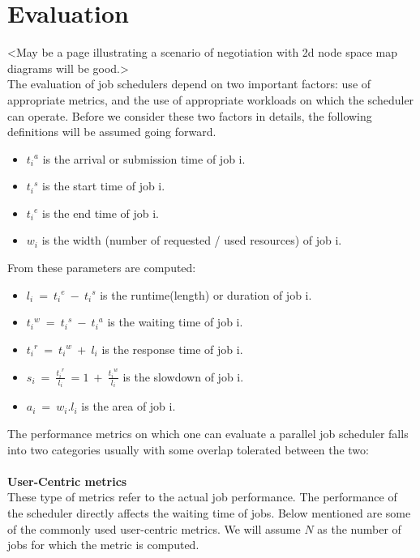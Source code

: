 \chapter{Evaluation}\label{chapter:evaluation}
<May be a page illustrating a scenario of negotiation with 2d node space map diagrams will be good.>\\
The evaluation of job schedulers depend on two important factors: use of appropriate metrics, and the use of appropriate workloads on which the scheduler can operate. Before we consider these two factors in details, the following definitions will be assumed going forward.
\begin{itemize}
\item \textit{${t_{i}}^{a}$} is the arrival or submission time of job i.
\item \textit{${t_{i}}^{s}$} is the start time of job i.
\item \textit{${t_{i}}^{e}$} is the end time of job i.
\item \textit{$w_{i}$} is the width (number of requested / used resources) of job i.
\end{itemize}
From these parameters are computed:
\begin{itemize}
\item \textit{$l_{i}\ =\ {t_{i}}^{e}\ -\ {t_{i}}^{s}$} is the runtime(length) or duration of job i.
\item \textit{${t_{i}}^{w}\ =\ {t_{i}}^{s}\ -\ {t_{i}}^{a}$} is the waiting time of job i.
\item \textit{${t_{i}}^{r}\ =\ {t_{i}}^{w}\ +\ l_{i}$} is the response time of job i.
\item \textit{$s_{i}\ =\ \frac{{t_{i}}^{r}}{l_{i}}\ = 1\ +\ \frac{{t_{i}}^{w}}{l_{i}}$} is the slowdown of job i.
\item \textit{$a_{i}\ =\ w_{i}.l_{i}$} is the area of job i.
\end{itemize}
The performance metrics on which one can evaluate a parallel job scheduler falls into two categories usually with some overlap tolerated between the two:\\ \\
\textbf{User-Centric metrics\cite{streit}}\\
These type of metrics refer to the actual job performance. The performance of the scheduler directly affects the waiting time of jobs. Below mentioned are some of the commonly used user-centric metrics. We will assume $N$ as the number of jobs for which the metric is computed.
